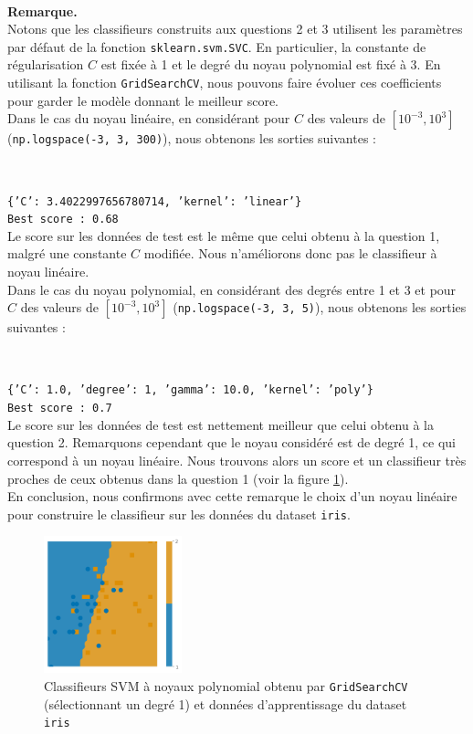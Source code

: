 \documentclass[11pt,a4paper]{article}
\theoremstyle{definition}
\begin{document}
\

\textbf{Remarque.}\\

Notons que les classifieurs construits aux questions 2 et 3 utilisent les paramètres par défaut de la fonction \texttt{sklearn.svm.SVC}. En particulier, la constante de régularisation $C$ est fixée à 1 et  le degré du noyau polynomial est fixé à 3.  En utilisant la fonction \texttt{GridSearchCV}, nous pouvons faire évoluer ces coefficients pour garder le modèle donnant le meilleur score. \\
Dans le cas du noyau linéaire, en considérant pour $C$ des valeurs de $[10^{-3},10^{3}]$ (\texttt{np.logspace(-3, 3, 300)}), nous obtenons les sorties suivantes :

\

\texttt{\{'C': 3.4022997656780714, 'kernel': 'linear'\}}\\
\texttt{Best score : 0.68}\\

Le score sur les données de test est le même que celui obtenu à la question 1, malgré une constante $C$ modifiée. Nous n'améliorons donc pas le classifieur à noyau linéaire.\\
Dans le cas du noyau polynomial, en considérant des degrés entre 1 et 3 et pour $C$ des valeurs de $[10^{-3},10^{3}]$ (\texttt{np.logspace(-3, 3, 5)}), nous obtenons les sorties suivantes :

\

\texttt{\{'C': 1.0, 'degree': 1, 'gamma': 10.0, 'kernel': 'poly'\}}\\
\texttt{Best score : 0.7}\\

Le score sur les données de test est nettement meilleur que celui obtenu à la question 2. Remarquons cependant que le noyau considéré est de degré 1, ce qui correspond à un noyau linéaire. Nous trouvons alors un score et un classifieur très proches de ceux obtenus dans la question 1 (voir la figure \ref{remarque}). \\
En conclusion, nous confirmons avec cette remarque le choix d'un noyau linéaire pour construire le classifieur sur les données du dataset \texttt{iris}.

 
\begin{figure}[h!]\centering
\includegraphics[width=4cm]{Images/rem.png}
\caption{Classifieurs SVM à noyaux polynomial obtenu par  \texttt{GridSearchCV} (sélectionnant un degré 1) et données d'apprentissage du dataset \texttt{iris}}
\label{remarque}
\end{figure}
\end{document}
